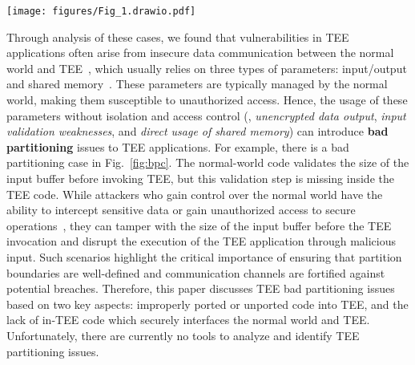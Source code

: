 \begin{figure*}[t]
    \centering
    \texttt{[image: figures/Fig\_1.drawio.pdf]}
    \caption{A bad partitioning case of input validation weaknesses.}
    \label{fig:bpc}
\end{figure*}

Through analysis of these cases, we found that vulnerabilities in TEE applications often arise from insecure data communication between the normal world and TEE~\cite{10.1145/3407023.3407072, 8365755}, which usually relies on three types of parameters: input/output and shared memory~\cite{s20041090}.
These parameters are typically managed by the normal world, making them susceptible to unauthorized access.
Hence, the usage of these parameters without isolation and access control (\eg, \textit{unencrypted data output}, \textit{input validation weaknesses}, and \textit{direct usage of shared memory}) can introduce \textbf{bad partitioning} issues to TEE applications.
For example, there is a bad partitioning case in Fig.~\ref{fig:bpc}. The normal-world code validates the size of the input buffer before invoking TEE, but this validation step is missing inside the TEE code.
While attackers who gain control over the normal world have the ability to intercept sensitive data or gain unauthorized access to secure operations~\cite{279916}, they can tamper with the size of the input buffer before the TEE invocation and disrupt the execution of the TEE application through malicious input.
Such scenarios highlight the critical importance of ensuring that partition boundaries are well-defined and communication channels are fortified against potential breaches.
Therefore, this paper discusses TEE bad partitioning issues based on two key aspects: improperly ported or unported code into TEE, and the lack of in-TEE code which securely interfaces the normal world and TEE.
Unfortunately, there are currently no tools to analyze and identify TEE partitioning issues.

